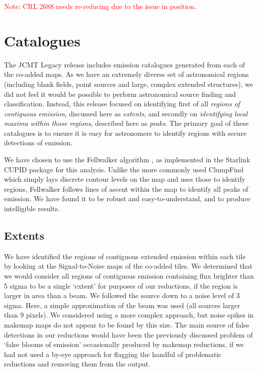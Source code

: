 \documentclass[twocolumn]{aastex6}
\newcommand{\note}[1]{\textcolor{red}{Note: #1}}
\begin{document}
\note{CRL 2688 needs re-reducing due to the issue in position.}

\section{Catalogues}
The JCMT Legacy release includes emission catalogues generated from
each of the co-added maps. As we have an extremely diverse set of
astronomical regions (including blank fields, point sources and large,
complex extended structures), we did not feel it would be possible to
perform astronomical source finding and classification. Instead, this
release focused on identifying first of all \emph{regions of
  contiguous emission}, discussed here as \emph{extents}, and secondly
on \emph{identifying local maxima within those regions}, described
here as \emph{peaks}. The primary goal of these catalogues is to
ensure it is easy for astronomers to identify regions with secure
detections of emission.

We have chosen to use the Fellwalker algorithm \citep{Berry2015}, as
implemented in the Starlink CUPID \citep{cupid} package for this
analysis. Unlike the more commonly used ClumpFind which simply lays
discrete contour levels on the map and uses those to identify regions,
Fellwalker follows lines of ascent within the map to identify all
peaks of emission. We have found it to be robust and
easy-to-understand, and to produce intelligible results.

\subsection{Extents}

We have identified the regions of contiguous extended emission within
each tile by looking at the Signal-to-Noise maps of the co-added
tiles. We determined that we would consider all regions of contiguous
emission containing flux brighter than 5 sigma to be a single `extent'
for purposes of our reductions, if the region is larger in area than a
beam. We followed the source down to a noise level of 3 sigma.  Here,
a simple approximation of the beam was used (all sources larger than 9
pixels). We considered using a more complex approach, but noise spikes
in makemap maps do not appear to be found by this size. The main
source of false detections in our reductions would have been the
previously discussed problem of `false blooms of emission'
occasionally produced by makemap reductions, if we had not used a
by-eye approach for flagging the handful of problematic reductions and
removing them from the output.
\end{document}
